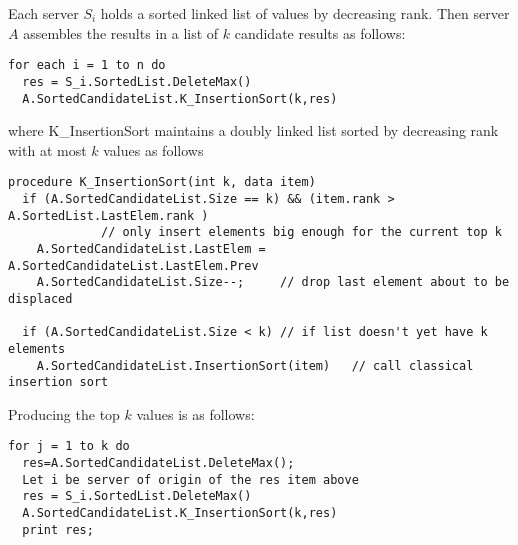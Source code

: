 \documentclass[12pt]{article}
\begin{document}
Each server $S_i$ holds a sorted linked list of values by
decreasing rank. Then server $A$ assembles the results in a list
of $k$ candidate results as follows:
\begin{verbatim}
for each i = 1 to n do
  res = S_i.SortedList.DeleteMax()
  A.SortedCandidateList.K_InsertionSort(k,res)
\end{verbatim}
where K\_InsertionSort maintains a doubly linked list sorted by decreasing rank with at most
$k$ values as follows
\begin{verbatim}
procedure K_InsertionSort(int k, data item)
  if (A.SortedCandidateList.Size == k) && (item.rank > A.SortedList.LastElem.rank )
             // only insert elements big enough for the current top k
    A.SortedCandidateList.LastElem = A.SortedCandidateList.LastElem.Prev
    A.SortedCandidateList.Size--;     // drop last element about to be displaced

  if (A.SortedCandidateList.Size < k) // if list doesn't yet have k elements
    A.SortedCandidateList.InsertionSort(item)   // call classical insertion sort
\end{verbatim}
Producing the top $k$ values is as follows:
\begin{verbatim}
for j = 1 to k do
  res=A.SortedCandidateList.DeleteMax();
  Let i be server of origin of the res item above
  res = S_i.SortedList.DeleteMax()
  A.SortedCandidateList.K_InsertionSort(k,res)
  print res;
\end{verbatim}
\end{document}
